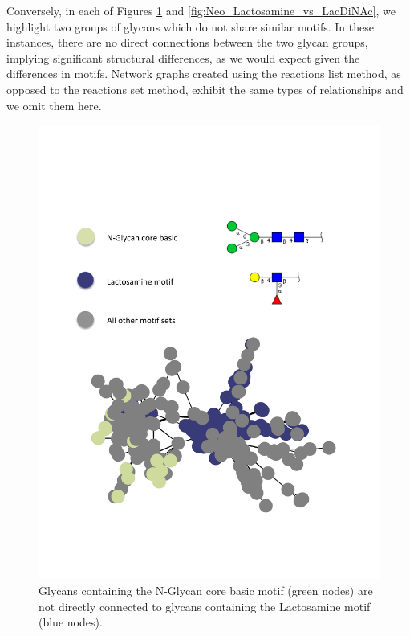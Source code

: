 \documentclass[12pt,a4paper]{article}
\begin{document}
Conversely, in each of Figures \ref{fig:N-Glycan_core_basic_vs_Lactosamine_motif} and \ref{fig:Neo_Lactosamine_vs_LacDiNAc}, we highlight two groups of glycans which do not share similar motifs. In these instances, there are no direct connections between the two glycan groups, implying significant structural differences, as we would expect given the differences in motifs. Network graphs created using the reactions list method, as opposed to the reactions set method, exhibit the same types of relationships and we omit them here.

\begin{figure}[H]
\centering 
\includegraphics[scale=0.9]{motif_similarity_exploration/N-Glycan_core_basic_vs_Lactosamine_motif.pdf} 
\caption{Glycans containing the N-Glycan core basic motif (green nodes) are not directly connected to glycans containing the Lactosamine motif (blue nodes).}
\label{fig:N-Glycan_core_basic_vs_Lactosamine_motif}
\end{figure}
\end{document}
